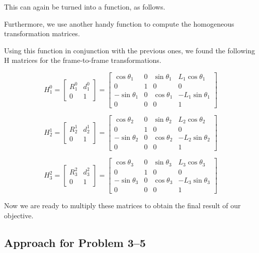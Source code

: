 \documentclass[conference]{IEEEtran}
\begin{document}
This can again be turned into a function, as follows.


Furthermore, we use another handy function to compute the homogeneous
transformation matrices.


Using this function in conjunction with the previous ones,
we found the following H matrices for the frame-to-frame transformations.

\[
    H^0_1 = \begin{bmatrix}
        R^0_1 & d^0_1\\
        0 & 1
    \end{bmatrix}
    =
    \begin{bmatrix}
        \cos\theta _{1} & 0 & \sin\theta _{1} & L_{1} \cos\theta_1\\
        0 & 1 & 0 & 0\\
        -\sin\theta _{1} & 0 & \cos\theta_{1} & -L_1 \sin\theta_1\\
        0 & 0 & 0 & 1
    \end{bmatrix}
\]

\[
    H^1_2 = \begin{bmatrix}
        R^1_2 & d^1_2\\
        0 & 1
    \end{bmatrix}
    =
    \begin{bmatrix}
        \cos\theta _{2} & 0 & \sin\theta _{2} & L_{2} \cos\theta_2\\
        0 & 1 & 0 & 0\\
        -\sin\theta _{2} & 0 & \cos\theta_{2} & -L_2 \sin\theta_2\\
        0 & 0 & 0 & 1
    \end{bmatrix}
\]

\[
    H^2_3 = \begin{bmatrix}
        R^2_3 & d^2_3\\
        0 & 1
    \end{bmatrix}
    =
    \begin{bmatrix}
        \cos\theta _{3} & 0 & \sin\theta _{3} & L_{3} \cos\theta_3\\
        0 & 1 & 0 & 0\\
        -\sin\theta _{3} & 0 & \cos\theta_{3} & -L_3 \sin\theta_3\\
        0 & 0 & 0 & 1
    \end{bmatrix}
\]

Now we are ready to multiply these matrices to obtain the final result
of our objective.

\subsection{Approach for Problem 3--5}
\end{document}
